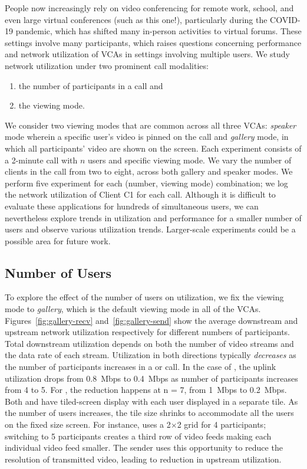People now increasingly rely on video conferencing for remote work,
school, and even large virtual conferences (such as this one!),
particularly during the COVID-19 pandemic, which has shifted many in-person
activities to virtual forums. These settings involve many
participants, which raises questions concerning performance and network
utilization of VCAs in settings involving multiple users.
We study network utilization under two prominent call modalities: 
\begin{enumerate}
    \itemsep=-1pt
    \item the
    number of participants in a call and 
\item the viewing mode.
\end{enumerate}
\noindent
We consider two
viewing modes that are common across all three VCAs: \textit{speaker} mode
wherein a specific user's video is pinned on the call and \textit{gallery}
mode, in which all participants' video are shown on the screen.  Each
experiment consists of a 2-minute call with $n$ users and specific viewing
mode. We vary the number of clients in the call from two to eight, across both
gallery and speaker modes.
We perform five experiment for each (number, viewing mode) combination; we log the
network utilization of Client C1 for each call.  Although it is
difficult to evaluate these applications for hundreds of simultaneous users,
we can nevertheless explore trends in utilization and performance for a
smaller number of users and observe various utilization trends. Larger-scale
experiments could be a possible area for future work.


\subsection{Number of Users}

To explore the effect of the number of users on utilization, we fix the
viewing mode to \textit{gallery}, which is the default viewing mode in all of
the VCAs. Figures~\ref{fig:gallery-recv} and~\ref{fig:gallery-send} show the
average downstream and upstream network utilization respectively for different
numbers of participants.  Total downstream utilization depends on both the
number of video streams and the data rate of each stream.  Utilization in both
directions typically {\em decreases} as the number of participants increases
in a \meet or \zoom call. In the case of \zoom, the uplink utilization drops
from 0.8~Mbps to 0.4~Mbps as number of participants increases from 4 to 5. For \meet, the reduction happens at n = 7, from
1~Mbps to 0.2~Mbps.  Both \meet and \zoom have tiled-screen display with each
user displayed in a separate tile.  As the number of users increases, the tile
size shrinks to accommodate all the users on the fixed size screen. For instance, \zoom uses a 2$\times$2 grid for 4 participants; switching to 5 participants creates a third row of video feeds making each individual video feed smaller.  The
sender uses this opportunity to reduce the resolution of transmitted video,
leading to reduction in upstream utilization.

